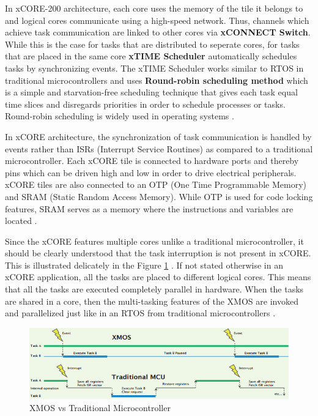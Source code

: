 In xCORE-200 architecture, each core uses the memory of the tile it belongs to and logical cores communicate using a high-speed network. Thus, channels which achieve task communication are linked to other cores via \textbf{xCONNECT Switch}. While this is the case for tasks that are distributed to seperate cores, for tasks that are placed in the same core \textbf{xTIME Scheduler} automatically schedules tasks by synchronizing events. The xTIME Scheduler works similar to RTOS in traditional microcontrollers and uses \textbf{Round-robin scheduling method} \cite{xmosdatasheet} \cite{roundrobin} which is a simple and starvation-free scheduling technique that gives each task equal time slices and disregards priorities in order to schedule processes or tasks. Round-robin scheduling is widely used in operating systems \cite{roundrobin}.

In xCORE architecture, the synchronization of task communication is handled by events rather than ISRs (Interrupt Service Routines) as compared to a traditional microcontroller. Each xCORE tile is connected to hardware ports and thereby pins which can be driven high and low in order to drive electrical peripherals. xCORE tiles are also connected to an OTP (One Time Programmable Memory) and SRAM (Static Random Access Memory). While OTP is used for code locking features, SRAM serves as a memory where the instructions and variables are located \cite{xmosdatasheet}.

Since the xCORE features multiple cores unlike a traditional microcontroller, it should be clearly understood that the task interruption is not present in xCORE. This is illustrated delicately in the Figure \ref{fig:xmosvstraditional} \cite{xmosflyer}. If not stated otherwise in an xCORE application, all the tasks are placed to different logical cores. This means that all the tasks are executed completely parallel in hardware. When the tasks are shared in a core, then the multi-tasking features of the XMOS are invoked and parallelized just like in an RTOS from traditional microcontrollers \cite{xmosflyer}.
\begin{figure}[!ht]
	\centering
	\includegraphics[width=\textwidth]{content/images/xmosvstraditional.png}
	\caption{XMOS vs Traditional Microcontroller \cite{xmosflyer}}
	\label{fig:xmosvstraditional}
\end{figure}

